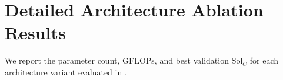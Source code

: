 \section{Detailed Architecture Ablation Results}
\label{app:detailed-ablation-tables}

We report the parameter count, GFLOPs, and best validation $\mathrm{Sol}_C$ for
each architecture variant evaluated in .

